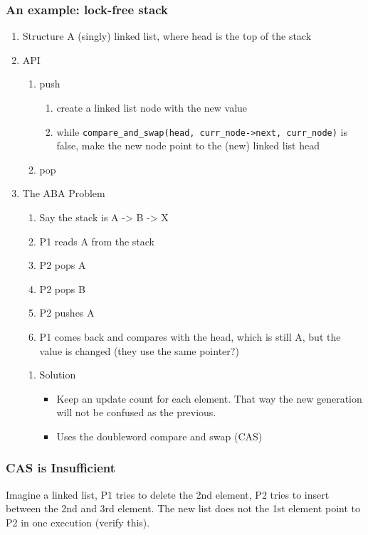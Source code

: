 \documentclass[11pt]{article}
\begin{document}
\subsubsection{An example: lock-free stack}
\label{sec:org988ef53}
\begin{enumerate}
\item Structure
\label{sec:org1f45070}
A (singly) linked list, where head is the top of the stack
\item API
\label{sec:org7052cd2}
\begin{enumerate}
\item push
\label{sec:org01e2afb}
\begin{enumerate}
\item create a linked list node with the new value
\item while \texttt{compare\_and\_swap(head, curr\_node->next, curr\_node)} is false, make the
new node point to the (new) linked list head
\end{enumerate}
\item pop
\label{sec:orgd67da1b}
\end{enumerate}
\item The ABA Problem
\label{sec:orgdefad77}
\begin{enumerate}
\item Say the stack is A -> B -> X
\item P1 reads A from the stack
\item P2 pops A
\item P2 pops B
\item P2 pushes A
\item P1 comes back and compares with the head, which is still A, but the value is
changed (they use the same pointer?)
\end{enumerate}
\begin{enumerate}
\item Solution
\label{sec:org3240b06}
\begin{itemize}
\item Keep an update count for each element. That way the new generation will not be
confused as the previous.
\item Uses the doubleword compare and swap (CAS)
\end{itemize}
\end{enumerate}
\end{enumerate}
\subsubsection{CAS is Insufficient}
\label{sec:org89ac0a8}
Imagine a linked list, P1 tries to delete the 2nd element, P2 tries to insert
between the 2nd and 3rd element. The new list does not the 1st element point to
P2 in one execution (verify this).
\end{document}
